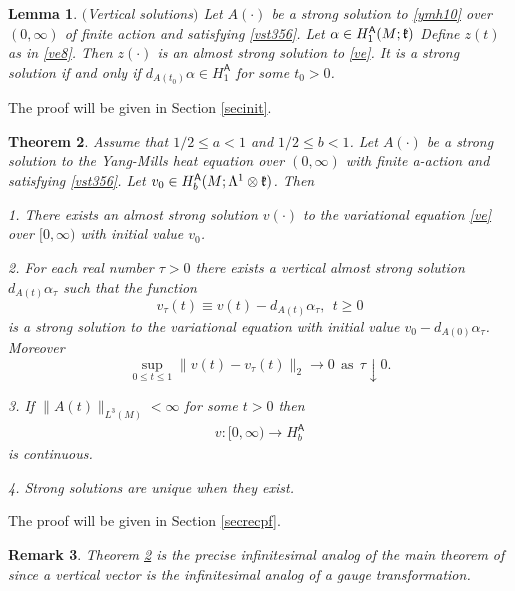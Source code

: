 \documentclass[12pt]{article}
\newtheorem{theorem}{Theorem}[section]
\newtheorem{lemma}[theorem]{Lemma}
\newtheorem{remark}[theorem]{Remark}
\def \L{\Lambda}
\def \As{\mathsf{A}}
\def \kf{\frak k}
\def \beq{\begin{equation}}
\def \eeq{\end{equation}}
\def \eref{\eqref}
\numberwithin{equation}{section}
\begin{document}
   
           \begin{lemma} \label{lemvert1} $(${\rm Vertical solutions}$)$
Let $A(\cdot)$ be a strong solution to \eref{ymh10}  over $(0, \infty)$  of finite action and 
satisfying \eref{vst356}.   
 Let $\alpha \in H_1^\As(M;\kf)$   
 Define $z(t)$ as in \eref{ve8}.
Then $z(\cdot)$ is an almost strong solution to  \eref{ve}. 
 It is a strong solution if and only if $d_{A(t_0)}\alpha \in H_1^\As$         
  for some   $t_0 >0$.
\end{lemma}
The proof will be given in Section \ref{secinit}. 



\begin{theorem} \label{thmveu1e} 
Assume that $1/2 \le a <1$ and $1/2 \le b <1$. 
 Let $A(\cdot)$ be a strong solution  to the Yang-Mills heat equation over $(0, \infty)$ with finite a-action
and satisfying \eref{vst356}.   
 Let $v_0 \in H_{b}^\As(M; \L^1\otimes \kf)$. Then
 
  
 1. There exists an almost strong solution $v(\cdot)$ to the variational equation \eref{ve} 
 over $[0, \infty)$ with initial value $v_0$.
  
  
  2. For each real number $\tau >0$ there exists a vertical almost strong 
solution $d_{A(t)}\alpha_\tau$ such  that the function
\beq
v_\tau(t) 
  \equiv v(t) - d_{A(t)}\alpha_\tau,\ \ t\ge 0             \label{ve21}
\eeq
is  a strong solution  to the variational equation with initial value $v_0 - d_{A(0)} \alpha_\tau$.
Moreover 
\beq
\sup_{0 \le t \le 1} \|v(t) - v_\tau(t)\|_2  
 \rightarrow 0\ \  \text{as} \ \ \tau\downarrow 0. \label{ve22a}
\eeq

3. If $\|A(t)\|_{L^3(M)} < \infty$ for some $t > 0$  then 
\begin{align}
v:[0,\infty) \rightarrow H_b^{\As}          \label{ve20}
\end{align}
is continuous.  


4.  Strong solutions are unique when they exist. 
\end{theorem}   
The proof will be given in Section \ref{secrecpf}.

\begin{remark}{\rm   Theorem \ref{thmveu1e} is the precise infinitesimal analog 
of the main theorem of \cite{G70} since a vertical vector is the  infinitesimal analog
 of a gauge transformation.
 }
 \end{remark}
 
 
  
\end{document}
